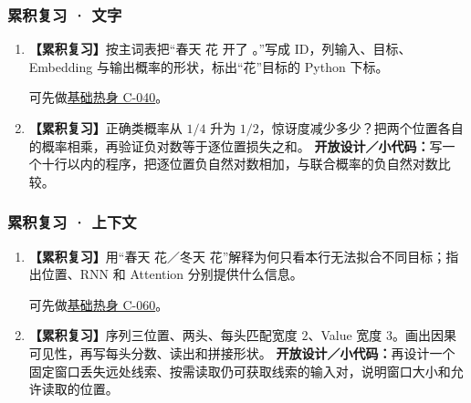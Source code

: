 \subsubsection*{累积复习 · 文字}
\begin{enumerate}[label={},leftmargin=4.8em,itemsep=4pt]
\item[\textbf{R-05.}] \leavevmode{}\label{exercise:R-05}\label{exercise:review-token-pipeline}\textbf{【累积复习】}按主词表把“春天 花 开了 。”写成 ID，列输入、目标、Embedding 与输出概率的形状，标出“花”目标的 Python 下标。\par 可先做\hyperref[exercise:shifted-token-targets]{基础热身 C-040}。
\item[\textbf{R-06.}] \leavevmode{}\label{exercise:R-06}\label{exercise:review-cross-entropy}\textbf{【累积复习】}正确类概率从 $1/4$ 升为 $1/2$，惊讶度减少多少？把两个位置各自的概率相乘，再验证负对数等于逐位置损失之和。
\textbf{开放设计／小代码：}写一个十行以内的程序，把逐位置负自然对数相加，与联合概率的负自然对数比较。
\end{enumerate}
\subsubsection*{累积复习 · 上下文}
\begin{enumerate}[label={},leftmargin=4.8em,itemsep=4pt]
\item[\textbf{R-07.}] \leavevmode{}\label{exercise:R-07}\label{exercise:review-context-evidence}\textbf{【累积复习】}用“春天 花／冬天 花”解释为何只看本行无法拟合不同目标；指出位置、RNN 和 Attention 分别提供什么信息。\par 可先做\hyperref[exercise:attention-shapes]{基础热身 C-060}。
\item[\textbf{R-08.}] \leavevmode{}\label{exercise:R-08}\label{exercise:review-multihead-shapes}\textbf{【累积复习】}序列三位置、两头、每头匹配宽度 $2$、Value 宽度 $3$。画出因果可见性，再写每头分数、读出和拼接形状。
\textbf{开放设计／小代码：}再设计一个固定窗口丢失远处线索、按需读取仍可获取线索的输入对，说明窗口大小和允许读取的位置。
\end{enumerate}
